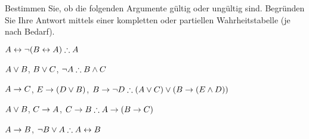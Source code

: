 \noindent\problempart Bestimmen Sie, ob die folgenden Argumente gültig oder ungültig sind. Begründen Sie Ihre Antwort mittels einer kompletten oder partiellen Wahrheitstabelle (je nach Bedarf).
\label{pr.TT.valid6} 
\begin{earg}
\item $A\eiff\enot(B\eiff A)\therefore A$ %
\item $A\vee B$, $B\vee C$, $\enot A\therefore B \eand C$ %
\item $A \rightarrow C$, $E \rightarrow (D \vee B)$, $B \eif \enot D\therefore (A \eor C) \eor (B \eif (E \eand D))$ %
\item $A \vee B$, $C \rightarrow A$, $C \eif B\therefore A \eif (B \eif C)$ %
\item $A \rightarrow B$, $\enot B \eor A\therefore A \eiff B$ %
\end{earg}
